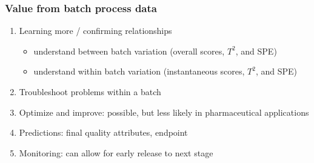 \documentclass[handout, 12pt]{beamer}
\begin{document}
\begin{frame}\frametitle{Value from batch process data}
\begin{enumerate}
	\item 	Learning more / confirming relationships
		
			\begin{itemize}
				\item 	understand between batch variation (overall scores, \( T^2 \), and SPE)
				\item 	understand within batch variation (instantaneous scores, \( T^2 \), and SPE)
			\end{itemize}
			
	\item 	Troubleshoot problems within a batch
	\item 	Optimize and improve: possible, but less likely in pharmaceutical applications
	\item 	Predictions: final quality attributes, endpoint
	\item 	Monitoring: can allow for early release to next stage
	
\end{enumerate}
\end{frame}
\end{document}
